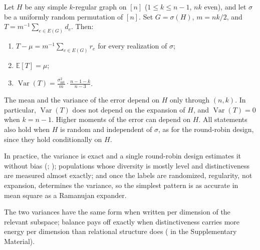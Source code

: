 \documentclass[twoside,11pt]{article}
\newcommand{\E}{\mathbb{E}}
\DeclareMathOperator{\Var}{Var}
\newcommand{\SND}{\mu}
\newcommand{\Pairs}{\mathcal{P}}
\newcommand{\sigmaint}{\sigma^2_{\mathrm{int}}}
\newcommand{\sigmatot}{\sigma^2_{\mathrm{tot}}}
\begin{document}
\begin{theorem}
\label{thm:balanced}
Let $H$ be any simple $k$-regular graph on $[n]$ ($1\le k\le n-1$, $nk$
even), and let $\sigma$ be a uniformly random permutation of $[n]$. Set
$G=\sigma(H)$, $m=nk/2$, and $T=m^{-1}\sum_{e\in E(G)}d_e$. Then:
\begin{enumerate}
\item[(i)] $T-\SND=m^{-1}\sum_{e\in E(G)}r_e$ for every realization of $\sigma$;
\item[(ii)] $\E[T]=\SND$;
\item[(iii)] $\displaystyle \Var(T)=\frac{\sigmaint}{m}\cdot\frac{n-1-k}{n-3}$.
\end{enumerate}
The mean and the variance of the error depend on $H$ only through $(n,k)$.
In particular, $\Var(T)$ does not depend on the expansion of $H$, and
$\Var(T)=0$ when $k=n-1$. Higher moments of the error can depend on $H$.
All statements also hold when $H$ is random and independent of $\sigma$, as
for the round-robin design, since they hold conditionally on $H$.
\end{theorem}

In practice, the variance is exact and a single round-robin design
estimates it without bias (; );
populations whose diversity is mostly level and distinctiveness are
measured almost exactly; and once the labels are randomized, regularity,
not expansion, determines the variance, so the simplest pattern is as
accurate in mean square as a Ramanujan expander.


The two variances have the same form when written per dimension of the
relevant subspace; balance pays off exactly when distinctiveness carries more
energy per dimension than relational structure does ( in the
Supplementary Material).
\end{document}
